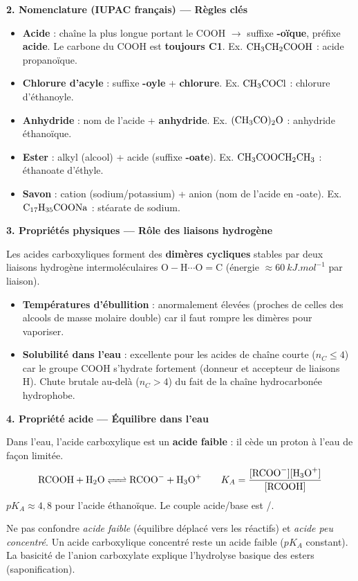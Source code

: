 \documentclass[11pt]{article}
\begin{document}
\begin{aretenir}
\textbf{2. Nomenclature (IUPAC français) — Règles clés}
\begin{itemize}
  \item \textbf{Acide} : chaîne la plus longue portant le $\mathrm{COOH}$ $\rightarrow$ suffixe \textbf{-oïque}, préfixe \textbf{acide}. Le carbone du $\mathrm{COOH}$ est \textbf{toujours C1}. Ex. $\ce{CH3CH2COOH}$ : acide propanoïque.
  \item \textbf{Chlorure d'acyle} : suffixe \textbf{-oyle} + \textbf{chlorure}. Ex. $\ce{CH3COCl}$ : chlorure d'éthanoyle.
  \item \textbf{Anhydride} : nom de l'acide + \textbf{anhydride}. Ex. $(\ce{CH3CO})_2\mathrm{O}$ : anhydride éthanoïque.
  \item \textbf{Ester} : alkyl (alcool) + acide (suffixe \textbf{-oate}). Ex. $\ce{CH3COOCH2CH3}$ : éthanoate d'éthyle.
  \item \textbf{Savon} : cation (sodium/potassium) + anion (nom de l'acide en -oate). Ex. $\ce{C17H35COONa}$ : stéarate de sodium.
\end{itemize}

\textbf{3. Propriétés physiques — Rôle des liaisons hydrogène}
\begin{propriete}
Les acides carboxyliques forment des \textbf{dimères cycliques} stables par deux liaisons hydrogène intermoléculaires $\mathrm{O-H\cdots O=C}$ (énergie $\approx \SI{60}{kJ.mol^{-1}}$ par liaison).
\begin{itemize}
  \item \textbf{Températures d'ébullition} : anormalement élevées (proches de celles des alcools de masse molaire double) car il faut rompre les dimères pour vaporiser.
  \item \textbf{Solubilité dans l'eau} : excellente pour les acides de chaîne courte ($n_C \le 4$) car le groupe $\mathrm{COOH}$ s'hydrate fortement (donneur et accepteur de liaisons H). Chute brutale au-delà ($n_C > 4$) du fait de la chaîne hydrocarbonée hydrophobe.
\end{itemize}
\end{propriete}

\textbf{4. Propriété acide — Équilibre dans l'eau}
\begin{definition}
Dans l'eau, l'acide carboxylique est un \textbf{acide faible} : il cède un proton à l'eau de façon limitée.
\[ \ce{RCOOH + H2O <=> RCOO- + H3O+} \qquad K_A = \frac{[\ce{RCOO-}][\ce{H3O+}]}{[\ce{RCOOH}]} \]
$pK_A \approx 4,8$ pour l'acide éthanoïque. Le couple acide/base est /.
\end{definition}
\begin{attention}
Ne pas confondre \emph{acide faible} (équilibre déplacé vers les réactifs) et \emph{acide peu concentré}. Un acide carboxylique concentré reste un acide faible ($pK_A$ constant). La basicité de l'anion carboxylate explique l'hydrolyse basique des esters (saponification).
\end{attention}


\end{aretenir}
\end{document}
